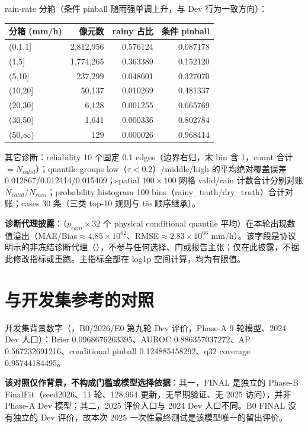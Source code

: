 \documentclass[UTF8,11pt,a4paper,fontset=windows]{ctexart}
\begin{document}
rain-rate 分箱（条件 pinball 随雨强单调上升，与 Dev 行为一致方向）：

\begin{longtable}{lrrr}
\textbf{分箱 (mm/h)} & \textbf{像元数} & \textbf{rainy 占比} & \textbf{条件 pinball}\\\hline
(0.1,1] & 2,812,956 & 0.576124 & 0.087178\\
(1,5] & 1,774,265 & 0.363389 & 0.152120\\
(5,10] & 237,299 & 0.048601 & 0.327070\\
(10,20] & 50,137 & 0.010269 & 0.481337\\
(20,30] & 6,128 & 0.001255 & 0.665769\\
(30,50] & 1,641 & 0.000336 & 0.802784\\
(50,$\infty$) & 129 & 0.000026 & 0.968414\\\hline
\end{longtable}

其它诊断：reliability 10 个固定 0.1 edges（边界右归，末 bin 含 1，count 合计 $=N_{valid}$）；quantile groups low（$\tau<0.2$）/middle/high 的平均绝对覆盖误差 0.012867/0.012414/0.015409；spatial $100\times100$ 网格 valid/rain 计数合计分别对账 $N_{valid}$/$N_{rain}$；probability histogram 100 bins（rainy\_truth/dry\_truth）合计对账；cases 30 条（三类 top-10 规则与 tie 顺序继承）。

\textbf{诊断代理披露}：（$p_{rain}\times32$ 个 physical conditional quantile 平均）在本轮出现数值溢出（MAE/Bias$\approx4.85\times10^{62}$、RMSE$\approx2.83\times10^{66}$ mm/h）。该字段是协议明示的非冻结诊断代理（），不参与任何选择、门或报告主张；仅在此披露，不据此修改指标或重跑。主指标全部在 log1p 空间计算，均为有限值。

\section{与开发集参考的对照}
开发集背景数字（，B0/2026/E0 第九轮 Dev 评价，Phase-A 9 轮模型、2024 Dev 人口）：Brier 0.0968676263395、AUROC 0.886357037272、AP 0.567232691216、conditional pinball 0.124885458292、q32 coverage 0.95744184495。

\textbf{该对照仅作背景，不构成门槛或模型选择依据}：其一，FINAL 是独立的 Phase-B FinalFit（seed2026、11 轮、128,964 更新，无早期验证、无 2025 访问），并非 Phase-A Dev 模型；其二，2025 评价人口与 2024 Dev 人口不同。B0 FINAL 没有独立的 Dev 评价，故本次 2025 一次性最终测试是该模型唯一的留出评价。
\end{document}
